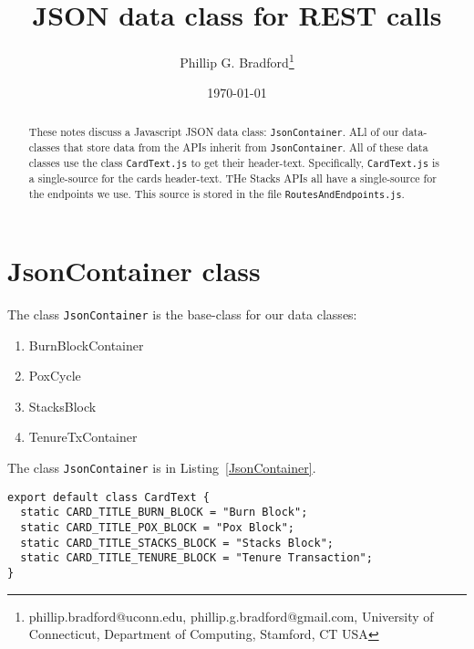 \documentclass[12pt]{article}
\begin{document}
\title{{\bf JSON} data class for REST calls}
\author{
Phillip G. Bradford\thanks{phillip.bradford@uconn.edu, phillip.g.bradford@gmail.com,
{\sc University of Connecticut, Department of Computing, Stamford, CT USA}}
}

\date{\small\today}

\maketitle

%
%
%
\begin{abstract}
These notes discuss a Javascript JSON data class: \lstinline|JsonContainer|.
ALl of our data-classes that store data from the APIs inherit from  \lstinline|JsonContainer|.
All of these data classes use the class \lstinline|CardText.js| to get their header-text.
Specifically, \lstinline|CardText.js| is a single-source for the cards header-text.
THe Stacks APIs all have a single-source for the endpoints we use.
This source is stored in the file \lstinline|RoutesAndEndpoints.js|.
\end{abstract}

%
%
%
%
\section{JsonContainer class}
\label{JsonContainer class}

The class \lstinline|JsonContainer| is the base-class for our data classes:

\begin{enumerate}

\item BurnBlockContainer

\item PoxCycle

\item StacksBlock

\item TenureTxContainer

\end{enumerate}

The class \lstinline|JsonContainer| is in Listing~\ref{JsonContainer}.

%
%
\vspace{0.2in}
%
%

\begin{lstlisting}[label=CardText,style=JSES6Base, caption={The single-source of text for cards on the screen}]
export default class CardText {
  static CARD_TITLE_BURN_BLOCK = "Burn Block";
  static CARD_TITLE_POX_BLOCK = "Pox Block";
  static CARD_TITLE_STACKS_BLOCK = "Stacks Block";
  static CARD_TITLE_TENURE_BLOCK = "Tenure Transaction";
}
\end{lstlisting}
\end{document}
